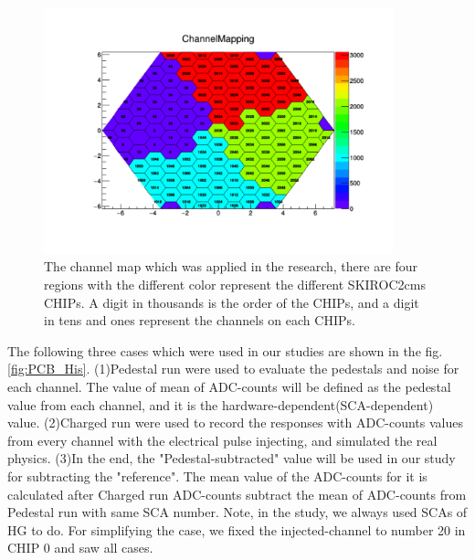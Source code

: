 \begin{figure}[!htb]
\centering
     \includegraphics[width=0.9\textwidth]{PCB_study/channelmap.pdf}
\caption{The channel map which was applied in the research, there are four regions with the different color represent the different SKIROC2cms CHIPs.  A digit in thousands is the order of the CHIPs, and a digit in tens and ones represent the channels on each CHIPs.}
\label{fig:PCB_study_channelMap}
\end{figure}

The following three cases which were used in our studies are shown in the fig.\ref{fig:PCB_His}. (1)Pedestal run were used to evaluate the pedestals and noise for each channel. The value of mean of ADC-counts will be defined as the pedestal value from each channel, and it is the hardware-dependent(SCA-dependent) value. (2)Charged run were used to record the responses with ADC-counts values from every channel with the electrical pulse injecting, and simulated the real physics. (3)In the end, the "Pedestal-subtracted" value will be used in our study for subtracting the "reference". The mean value of the ADC-counts for it is calculated after Charged run ADC-counts subtract the mean of ADC-counts from Pedestal run with same SCA number. Note, in the study, we always used SCAs of HG to do. For simplifying the case, we fixed the injected-channel to number 20 in CHIP 0 and saw all cases.

